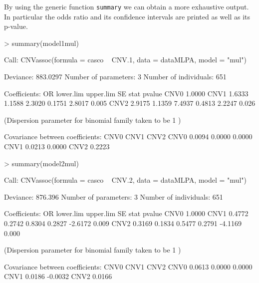 \documentclass[11pt]{article}
\begin{document}
By using the generic function {\tt summary} we can obtain a more exhaustive output. In particular the odds ratio and its confidence 
intervals are printed as well as its p-value.



\begin{Schunk}
\begin{Sinput}
> summary(model1mul)
\end{Sinput}
\begin{Soutput}
Call:
CNVassoc(formula = casco ~ CNV.1, data = dataMLPA, model = "mul")

Deviance: 883.0297 
Number of parameters: 3 
Number of individuals: 651 

Coefficients:
         OR lower.lim upper.lim     SE   stat pvalue
CNV0 1.0000                                         
CNV1 1.6333    1.1588    2.3020 0.1751 2.8017  0.005
CNV2 2.9175    1.1359    7.4937 0.4813 2.2247  0.026

(Dispersion parameter for  binomial  family taken to be  1 )


Covariance between coefficients:
     CNV0   CNV1   CNV2  
CNV0 0.0094 0.0000 0.0000
CNV1        0.0213 0.0000
CNV2               0.2223
\end{Soutput}
\end{Schunk}





\begin{Schunk}
\begin{Sinput}
> summary(model2mul)
\end{Sinput}
\begin{Soutput}
Call:
CNVassoc(formula = casco ~ CNV.2, data = dataMLPA, model = "mul")

Deviance: 876.396 
Number of parameters: 3 
Number of individuals: 651 

Coefficients:
          OR lower.lim upper.lim      SE    stat pvalue
CNV0  1.0000                                           
CNV1  0.4772    0.2742    0.8304  0.2827 -2.6172  0.009
CNV2  0.3169    0.1834    0.5477  0.2791 -4.1169  0.000

(Dispersion parameter for  binomial  family taken to be  1 )


Covariance between coefficients:
     CNV0    CNV1    CNV2   
CNV0  0.0613  0.0000  0.0000
CNV1          0.0186 -0.0032
CNV2                  0.0166
\end{Soutput}
\end{Schunk}
\end{document}
